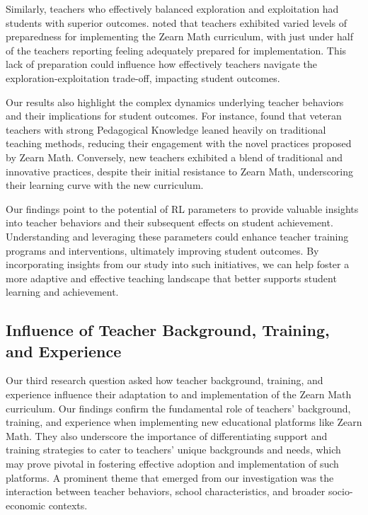 \documentclass[
  number,
  preprint,
  3p,
  onecolumn]{elsarticle}
\begin{document}
Similarly, teachers who effectively balanced exploration and
exploitation had students with superior outcomes. \citep{morrison2019}
noted that teachers exhibited varied levels of preparedness for
implementing the Zearn Math curriculum, with just under half of the
teachers reporting feeling adequately prepared for implementation. This
lack of preparation could influence how effectively teachers navigate
the exploration-exploitation trade-off, impacting student outcomes.

Our results also highlight the complex dynamics underlying teacher
behaviors and their implications for student outcomes. For instance,
\citep{knudsen2020} found that veteran teachers with strong Pedagogical
Knowledge leaned heavily on traditional teaching methods, reducing their
engagement with the novel practices proposed by Zearn Math. Conversely,
new teachers exhibited a blend of traditional and innovative practices,
despite their initial resistance to Zearn Math, underscoring their
learning curve with the new curriculum.

Our findings point to the potential of RL parameters to provide valuable
insights into teacher behaviors and their subsequent effects on student
achievement. Understanding and leveraging these parameters could enhance
teacher training programs and interventions, ultimately improving
student outcomes. By incorporating insights from our study into such
initiatives, we can help foster a more adaptive and effective teaching
landscape that better supports student learning and achievement.

\subsection{Influence of Teacher Background, Training, and
Experience}\label{influence-of-teacher-background-training-and-experience}

Our third research question asked how teacher background, training, and
experience influence their adaptation to and implementation of the Zearn
Math curriculum. Our findings confirm the fundamental role of teachers'
background, training, and experience when implementing new educational
platforms like Zearn Math. They also underscore the importance of
differentiating support and training strategies to cater to teachers'
unique backgrounds and needs, which may prove pivotal in fostering
effective adoption and implementation of such platforms. A prominent
theme that emerged from our investigation was the interaction between
teacher behaviors, school characteristics, and broader socio-economic
contexts.
\end{document}
